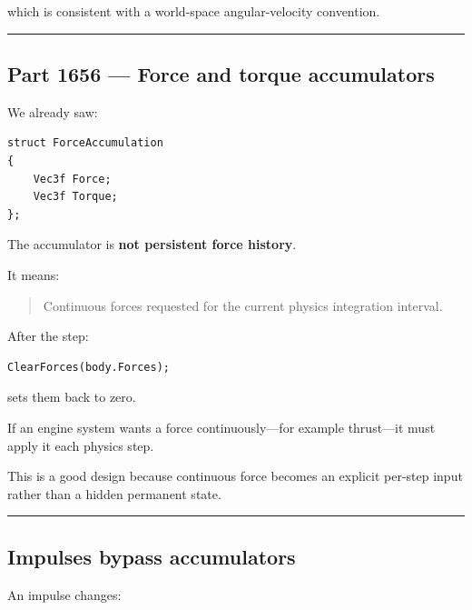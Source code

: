 which is consistent with a world-space angular-velocity convention.

\begin{center}\rule{0.5\linewidth}{0.5pt}\end{center}

\subsection{Part 1656 --- Force and torque accumulators}\label{06-engine-ii-ch037-part-1656-force-and-torque-accumulators}

\hypertarget{06-engine-ii-ch037-part-1656-force-and-torque-accumulators}{}

We already saw:

\begin{verbatim}
struct ForceAccumulation
{
    Vec3f Force;
    Vec3f Torque;
};
\end{verbatim}

The accumulator is \textbf{not persistent force history}.

It means:

\begin{quote}
Continuous forces requested for the current physics integration interval.
\end{quote}

After the step:

\begin{verbatim}
ClearForces(body.Forces);
\end{verbatim}

sets them back to zero.

If an engine system wants a force continuously---for example thrust---it must apply it each physics step.

This is a good design because continuous force becomes an explicit per-step input rather than a hidden permanent state.

\begin{center}\rule{0.5\linewidth}{0.5pt}\end{center}

\subsection{Impulses bypass accumulators}\label{06-engine-ii-ch037-impulses-bypass-accumulators}

\hypertarget{06-engine-ii-ch037-impulses-bypass-accumulators}{}

An impulse changes:

